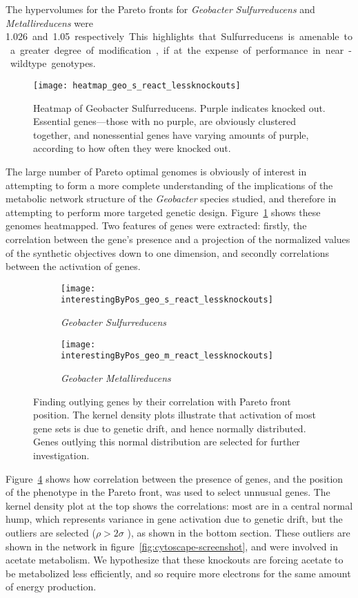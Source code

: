 \documentclass[a4paper]{article}
\begin{document}
The hypervolumes for the Pareto fronts for {\it Geobacter} {\it Sulfurreducens} and {\it Metallireducens} were \SI{1.026} and \SI{1.05} respectively. This highlights that Sulfurreducens is amenable to a greater degree of modification, if at the expense of performance in near-wildtype genotypes.

\begin{figure}[!htb]
\texttt{[image: heatmap\_geo\_s\_react\_lessknockouts]}
\caption{Heatmap of Geobacter Sulfurreducens. Purple indicates knocked out. Essential genes---those with no purple, are obviously clustered together, and nonessential genes have varying amounts of purple, according to how often they were knocked out.} 
\label{fig:heatmap}
\end{figure}

The large number of Pareto optimal genomes is obviously of interest in attempting to form a more complete understanding of the implications of the metabolic network structure of the {\it Geobacter} species studied, and therefore in attempting to perform more targeted genetic design. Figure~\ref{fig:heatmap} shows these genomes heatmapped. Two features of genes were extracted: firstly, the correlation between the gene’s presence and a projection of the normalized values of the synthetic objectives down to one dimension, and secondly correlations between the activation of genes. 

\begin{figure}[!htb]
	\begin{subfigure}[htb]{\textwidth}
                \texttt{[image: interestingByPos\_geo\_s\_react\_lessknockouts]}
                \caption{\it Geobacter Sulfurreducens}
                \label{fig:outlyinggenes:sul}
	\end{subfigure}
	\begin{subfigure}[htb]{\textwidth}
                \texttt{[image: interestingByPos\_geo\_m\_react\_lessknockouts]}
                \caption{\it Geobacter Metallireducens}
                \label{fig:outlyinggenes:met}
	\end{subfigure}
	\caption{Finding outlying genes by their correlation with Pareto front position. The kernel density plots illustrate that activation of most gene sets is due to genetic drift, and hence normally distributed. Genes outlying this normal distribution are selected for further investigation.}
	\label{fig:outlyinggenes}
\end{figure}

Figure~\ref{fig:outlyinggenes} shows how correlation between the presence of genes, and the position of the phenotype in the Pareto front, was used to select unnusual genes. The kernel density plot at the top shows the correlations: most are in a central normal hump, which represents variance in gene activation due to genetic drift, but the outliers are selected (\( \rho > 2\sigma \) ), as shown in the bottom section. These outliers are shown in the network in figure~\ref{fig:cytoscape-screenshot}, and were involved in acetate metabolism. We hypothesize that these knockouts are forcing acetate to be metabolized less efficiently, and so require more electrons for the same amount of energy production.
\end{document}
